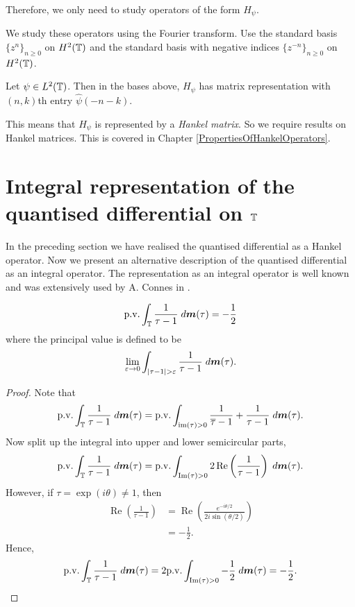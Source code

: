 Therefore, we only need to study operators of the form $H_\psi$.

We study these operators using the Fourier transform. Use the standard basis $\{z^n\}_{n\geq 0}$
on $H^2(\mathbb{T})$ and the standard basis with negative indices $\{z^{-n}\}_{n \geq 0}$ on $H^2(\mathbb{T})$.

Let $\psi \in L^2(\mathbb{T})$. Then in the bases above, $H_\psi$ has matrix representation
with $(n,k)$th entry $\hat{\psi}(-n-k)$. 

This means that $H_\psi$ is represented by a \emph{Hankel matrix}. So we require
results on Hankel matrices. This is covered in Chapter \ref{PropertiesOfHankelOperators}.

\section{Integral representation of the quantised differential on $\mathbb{T}$}
In the preceding section we have realised the quantised differential as a Hankel operator. Now we present
an alternative description of the quantised differential as an integral operator. The representation
as an integral operator is well known and was extensively used by A. Connes in \cite{Connes94}.
\begin{lemma}
\label{singularIntegral}
    \begin{equation}
        \mathrm{p.v.}\int_{\mathbb{T}} \frac{1}{\tau-1}\;d\boldsymbol{m}(\tau) = -\frac{1}{2}
    \end{equation}
    where the principal value is defined to be
    \begin{equation}
        \lim_{\varepsilon\rightarrow 0} \int_{|\tau-1|>\varepsilon} \frac{1}{\tau-1}\;d\ha(\tau).
    \end{equation}
\end{lemma} 
\begin{proof}
    Note that
    \begin{equation}
        \mathrm{p.v.}\int_{\mathbb{T}} \frac{1}{\tau-1}\;d\boldsymbol{m}(\tau) = \mathrm{p.v.}\int_{\operatorname{im}(\tau) > 0} \frac{1}{\overline{\tau}-1}+\frac{1}{\tau-1}\;d\boldsymbol{m}(\tau).
    \end{equation}
    Now split up the integral into upper and lower semicircular parts,
    \begin{equation}
        \mathrm{p.v.}\int_{\mathbb{T}} \frac{1}{\tau-1}\;d\boldsymbol{m}(\tau) = \mathrm{p.v.}\int_{\operatorname{Im}(\tau)>0} 2\operatorname{Re}\left(\frac{1}{\tau-1}\right)\;d\boldsymbol{m}(\tau).
    \end{equation}
    However, if $\tau = \exp(i\theta) \neq 1$, then
    \begin{align*}
        \operatorname{Re}\left(\frac{1}{\tau-1}\right) &= \operatorname{Re}\left(\frac{e^{-i\theta/2}}{2i\sin(\theta/2)}\right)\\
        &= -\frac{1}{2}.
    \end{align*}
    Hence,
    \begin{equation}
        \mathrm{p.v.}\int_{\mathbb{T}} \frac{1}{\tau-1}\;d\boldsymbol{m}(\tau) = 2\mathrm{p.v.}\int_{\operatorname{Im}(\tau)>0} -\frac{1}{2}\;d\boldsymbol{m}(\tau) = -\frac{1}{2}.
    \end{equation}
\end{proof}
